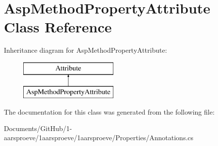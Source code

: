 \hypertarget{class_asp_method_property_attribute}{}\section{Asp\+Method\+Property\+Attribute Class Reference}
\label{class_asp_method_property_attribute}
Inheritance diagram for Asp\+Method\+Property\+Attribute\+:\begin{figure}[H]
\begin{center}
\leavevmode
\includegraphics[height=2.000000cm]{class_asp_method_property_attribute}
\end{center}
\end{figure}


The documentation for this class was generated from the following file\+:\begin{DoxyCompactItemize}
\item 
Documents/\+Git\+Hub/1-\/aarsproeve/1aarsproeve/1aarsproeve/\+Properties/Annotations.\+cs\end{DoxyCompactItemize}
